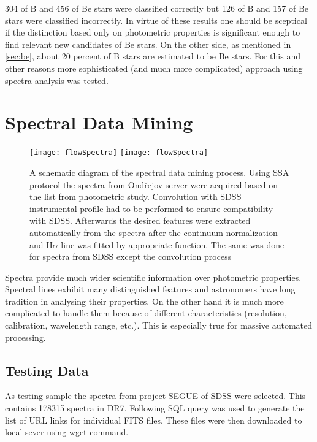 304 of B and 456 of Be stars were classified correctly but 126 of B
and 157 of Be stars were classified incorrectly. In virtue of these
results one should be sceptical if the distinction based only on
photometric properties is significant enough to find relevant new
candidates of Be stars. On the other side, as mentioned in
\ref{sec:be}, about 20 percent of B stars are estimated to be Be
stars. For this and other reasons more sophisticated (and much more
complicated) approach using spectra analysis was tested.

\section{Spectral Data Mining}
\label{sec:spectral}

   \begin{figure}[!htbp]
      \begin{center}
        \leavevmode
        \ifpdf
        \texttt{[image: flowSpectra]}
        \else
        \texttt{[image: flowSpectra]}
        \fi
        \caption{A schematic diagram of the spectral data mining
          process. Using SSA protocol the spectra from Ond\v{r}ejov server
          were acquired based on the list from photometric study. %
          Convolution with SDSS instrumental profile had to be
          performed to ensure compatibility with SDSS. Afterwards the
          desired features were extracted automatically from the
          spectra after the continuum normalization and H$\alpha$ line
          was fitted by appropriate function. The same was done for
          spectra from SDSS except the convolution process}
        \label{FigFlowSpectra}
      \end{center}
    \end{figure}

 

    Spectra provide much wider scientific information over photometric
    properties. Spectral lines exhibit many distinguished features and
    astronomers have long tradition in analysing their properties. On
    the other hand it is much more complicated to handle them because of
    different characteristics (resolution, calibration, wavelength
    range, etc.). This is especially true for massive automated
    processing.

\subsection{Testing Data}
As testing sample the spectra from project SEGUE of SDSS were
selected. This contains 178315 spectra in DR7. Following SQL query was
used to generate the list of URL links for individual FITS
files. These files were then downloaded to local sever using
\textrm{wget} command.


